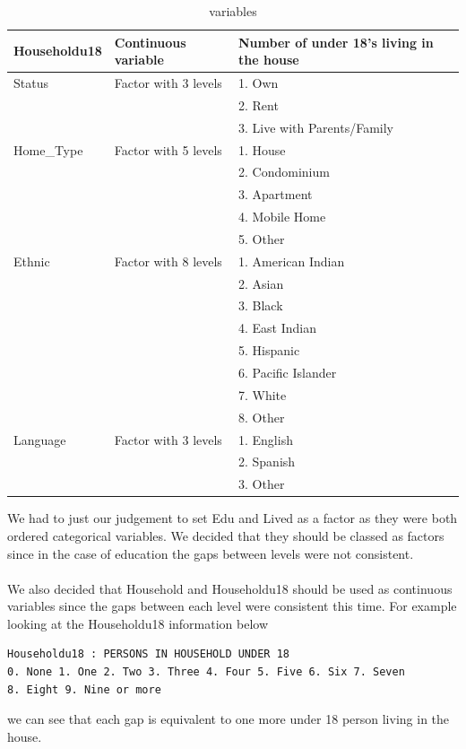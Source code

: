 \documentclass{article}
\begin{document}
\begin{table}[H]
\centering
\begin{tabular}{|l|l|l|}
\hline
Householdu18 &Continuous variable  &Number of under 18's living in the house\\
\hline
Status       &Factor with 3 levels &1. Own \\
&&2. Rent \\
&&3. Live with Parents/Family\\
\hline
Home\_Type   &Factor with 5 levels &1. House \\
&&2. Condominium \\
&&3. Apartment \\
&&4. Mobile Home \\
&&5. Other\\
\hline
Ethnic       &Factor with 8 levels &1. American Indian \\
&&2. Asian \\
&&3. Black \\
&&4. East Indian \\
&&5. Hispanic \\
&&6. Pacific Islander \\
&&7. White \\
&&8. Other\\
\hline
Language     &Factor with 3 levels &1. English \\
&&2. Spanish \\
&&3. Other\\
\hline
\end{tabular}
\caption{variables}
\label{variables}
\end{table}

\noindent We had to just our judgement to set \textsf{Edu} and \textsf{Lived} as a factor as they were both ordered categorical variables. We decided that they should be classed as factors since in the case of education the gaps between levels were not consistent.
\\\\
We also decided that \textsf{Household} and \textsf{Householdu18} should be used as continuous variables since the gaps between each level were consistent this time. For example looking at the \textsf{Householdu18} information below
\begin{verbatim}
Householdu18 : PERSONS IN HOUSEHOLD UNDER 18 
0. None 1. One 2. Two 3. Three 4. Four 5. Five 6. Six 7. Seven 
8. Eight 9. Nine or more
\end{verbatim}
we can see that each gap is equivalent to one more under 18 person living in the house.
\end{document}
